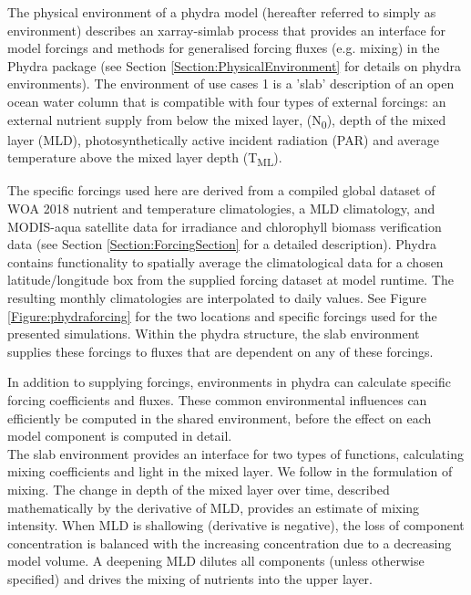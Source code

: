 \documentclass[template.tex]{subfiles}
\begin{document}
The physical environment of a phydra model (hereafter referred to simply as environment) describes an xarray-simlab process that provides an interface for model forcings and methods for generalised forcing fluxes (e.g. mixing) in the Phydra package (see Section \ref{Section:PhysicalEnvironment} for details on phydra environments).
The environment of use cases 1 is a 'slab' description of an open ocean water column that is compatible with four types of external forcings: an external nutrient supply from below the mixed layer, (\unit{N_0}), depth of the mixed layer (MLD), photosynthetically active incident radiation (PAR) and average temperature above the mixed layer depth (\unit{T_{ML}}).

The specific forcings used here are derived from a compiled global dataset of WOA 2018 nutrient and temperature climatologies, a MLD climatology, and MODIS-aqua satellite data for irradiance and chlorophyll biomass verification data (see Section \ref{Section:ForcingSection} for a detailed description). Phydra contains functionality to spatially average the climatological data for a chosen latitude/longitude box from the supplied forcing dataset at model runtime. The resulting monthly climatologies are interpolated to daily values. See Figure \ref{Figure:phydraforcing} for the two locations and specific forcings used for the presented simulations. Within the phydra structure, the slab environment supplies these forcings to fluxes that are dependent on any of these forcings.

In addition to supplying forcings, environments in phydra can calculate specific forcing coefficients and fluxes. These common environmental influences can efficiently be computed in the shared environment, before the effect on each model component is computed in detail. \\

The slab environment provides an interface for two types of functions, calculating mixing coefficients and light in the mixed layer. We follow \citet{Evans1985ACycles} in the formulation of mixing. The change in depth of the mixed layer over time, described mathematically by the derivative of MLD, provides an estimate of mixing intensity. When MLD is shallowing (derivative is negative), the loss of component concentration is balanced with the increasing concentration due to a decreasing model volume. A deepening MLD dilutes all components (unless otherwise specified) and drives the mixing of nutrients into the upper layer. 
\end{document}
